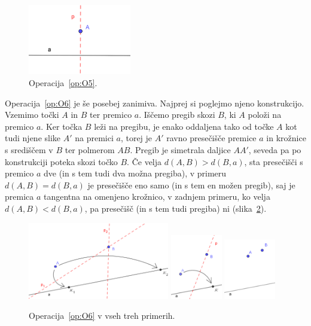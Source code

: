 \begin{figure}[h]
    \centering
    \includegraphics[width=0.4\textwidth]{images/origami_operacije/O5.png}
    \caption[Operacija~\ref{op:O5}]{Operacija~\ref{op:O5}.}
    \label{fig:O5}
\end{figure}

Operacija~\ref{op:O6} je še posebej zanimiva. Najprej si poglejmo njeno konstrukcijo. Vzemimo točki $A$ in $B$ ter premico $a$. Iščemo pregib skozi $B$, ki $A$ položi na premico $a$. Ker točka $B$ leži na pregibu, je enako oddaljena tako od točke $A$ kot tudi njene slike $A'$ na premici $a$, torej je $A'$ ravno presečišče premice $a$ in krožnice s središčem v $B$ ter polmerom $AB$. Pregib je simetrala daljice $AA'$, seveda pa po konstrukciji poteka skozi točko $B$. Če velja $ d(A,B) > d(B,a) $, sta presečišči s premico $a$ dve (in s tem tudi dva možna pregiba), v primeru $ d(A,B) = d(B,a) $ je presečišče eno samo (in s tem en možen pregib), saj je premica $a$ tangentna na omenjeno krožnico, v zadnjem primeru, ko velja $ d(A,B) < d(B,a) $, pa presečišč (in s tem tudi pregiba) ni (slika~\ref{fig:O6}).

\begin{figure}[h]
    \centering
    \includegraphics[width=0.55\textwidth]{images/origami_operacije/O6a.png}
    \includegraphics[width=0.2\textwidth]{images/origami_operacije/O6b.png}
    \includegraphics[width=0.2\textwidth]{images/origami_operacije/O6c.png}
    \caption[Operacija~\ref{op:O6}]{Operacija~\ref{op:O6} v vseh treh primerih.}
    \label{fig:O6}
\end{figure}

